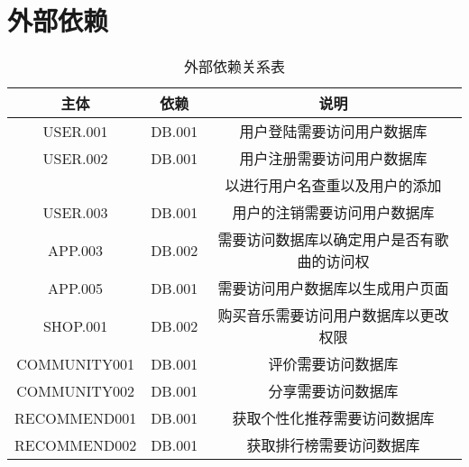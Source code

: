 \section{外部依赖}
\begin{table}[h]
    \caption {外部依赖关系表}
    \begin{tabular}{|c|c|c|}
        \hline
        主体 & 依赖 & 说明\\
        \hline
        USER.001 & DB.001 & 用户登陆需要访问用户数据库\\
        \hline
        USER.002 & DB.001 & 用户注册需要访问用户数据库\\
        & & 以进行用户名查重以及用户的添加\\
        \hline
        USER.003 & DB.001 & 用户的注销需要访问用户数据库\\
        \hline
        APP.003 & DB.002 & 需要访问数据库以确定用户是否有歌曲的访问权\\
        \hline
        APP.005 & DB.001 & 需要访问用户数据库以生成用户页面\\
        \hline
        SHOP.001 & DB.002 & 购买音乐需要访问用户数据库以更改权限\\
        \hline
        COMMUNITY001 & DB.001 & 评价需要访问数据库\\
        \hline
        COMMUNITY002 & DB.001 & 分享需要访问数据库\\
        \hline
        RECOMMEND001 & DB.001 & 获取个性化推荐需要访问数据库\\
        \hline
        RECOMMEND002 & DB.001 & 获取排行榜需要访问数据库\\
        \hline
    \end{tabular}
\end{table}
